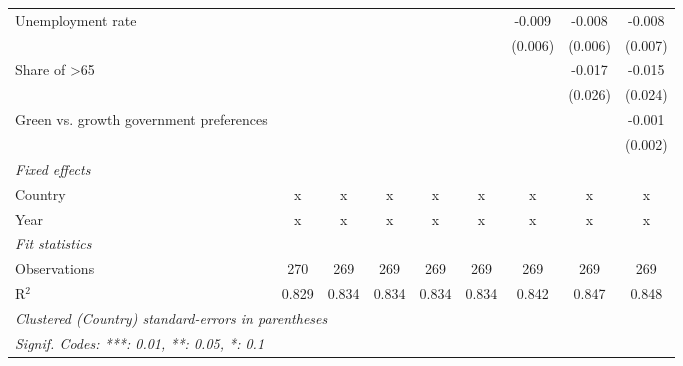 \begin{table}[htbp]
\begin{tabular}{lcccccccc}
      Unemployment rate                                                  &         &         &         &         &         & -0.009  & -0.008  & -0.008\\   
                                                                         &         &         &         &         &         & (0.006) & (0.006) & (0.007)\\   
      Share of >65                                                       &         &         &         &         &         &         & -0.017  & -0.015\\   
                                                                         &         &         &         &         &         &         & (0.026) & (0.024)\\   
      Green vs. growth government preferences                            &         &         &         &         &         &         &         & -0.001\\   
                                                                         &         &         &         &         &         &         &         & (0.002)\\   
      \emph{Fixed effects}\\
      Country                                                            & x       & x       & x       & x       & x       & x       & x       & x\\  
      Year                                                               & x       & x       & x       & x       & x       & x       & x       & x\\  
      \midrule \emph{Fit statistics}\\
      Observations                                                       & 270     & 269     & 269     & 269     & 269     & 269     & 269     & 269\\  
      R$^2$                                                              & 0.829   & 0.834   & 0.834   & 0.834   & 0.834   & 0.842   & 0.847   & 0.848\\  
      \midrule
      \multicolumn{9}{l}{\emph{Clustered (Country) standard-errors in parentheses}}\\
      \multicolumn{9}{l}{\emph{Signif. Codes: ***: 0.01, **: 0.05, *: 0.1}}\\
   \end{tabular}
\end{table}


